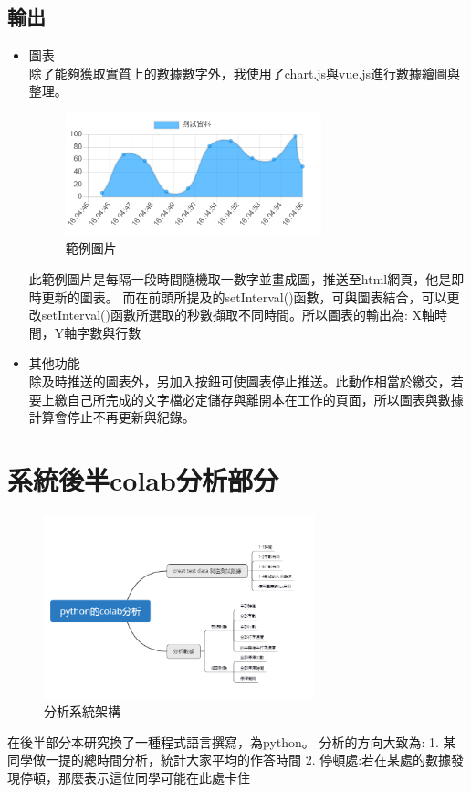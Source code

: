 \subsection{輸出}
\begin{itemize}
	\item 圖表\\
	除了能夠獲取實質上的數據數字外，我使用了chart.js與vue.js進行數據繪圖與整理。\cite{name21}
	\begin{figure}[H] %
		\centering %
		\includegraphics[width=0.7\textwidth]{3.png} %
		\caption{範例圖片} %
		\label{Fig.3.2} %
	\end{figure}
此範例圖片是每隔一段時間隨機取一數字並畫成圖，推送至html網頁，他是即時更新的圖表。
而在前頭所提及的setInterval()函數，可與圖表結合，可以更改setInterval()函數所選取的秒數擷取不同時間。所以圖表的輸出為: X軸時間，Y軸字數與行數
	\item 其他功能\\
	除及時推送的圖表外，另加入按鈕可使圖表停止推送。此動作相當於繳交，若要上繳自己所完成的文字檔必定儲存與離開本在工作的頁面，所以圖表與數據計算會停止不再更新與紀錄。
\end{itemize}
\section{系統後半colab分析部分}
	\begin{figure}[H] %
	\centering %
	\includegraphics[width=0.7\textwidth]{2.png} %
	\caption{分析系統架構} %
	\label{Fig.3.3} %
	\end{figure}
在後半部分本研究換了一種程式語言撰寫，為python。
分析的方向大致為:
1. 某同學做一提的總時間分析，統計大家平均的作答時間
2. 停頓處:若在某處的數據發現停頓，那麼表示這位同學可能在此處卡住
